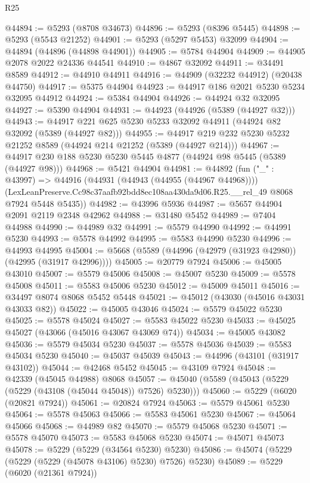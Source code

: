 \begin{lexlean}{R25}
\begin{coremodule}
@44894 := @5293 (@8708 @34673)
@44896 := @5293 (@8396 @5445)
@44898 := @5293 (@5543 @21252)
@44901 := @5293 (@5297 @5453) @32099
@44904 := @44894 (@44896 (@44898 @44901))
@44905 := @5784 @44904
@44909 := @44905 @2078 @2022 @24336 @44541
@44910 := @4867 @32092
@44911 := @34491 @8589
@44912 := @44910 @44911
@44916 := @44909 (@32232 @44912) (@20438 @44750)
@44917 := @5375 @44904
@44923 := @44917 @186 @2021 @5230 @5234 @32095 @44912
@44924 := @5384 @44904
@44926 := @44924 @32 @32095
@44927 := @5390 @44904
@44931 := @44923 (@44926 (@5389 (@44927 @32)))
@44943 := @44917 @221 @625 @5230 @5233 @32092 @44911 (@44924 @82 @32092 (@5389 (@44927 @82)))
@44955 := @44917 @219 @232 @5230 @5232 @21252 @8589 (@44924 @214 @21252 (@5389 (@44927 @214)))
@44967 := @44917 @230 @188 @5230 @5230 @5445 @4877 (@44924 @98 @5445 (@5389 (@44927 @98)))
@44968 := @5421 @44904
@44981 := @44892
    (fun ("_" : @43997) =>
    @44916
      (@44931 (@44943 (@44955 (@44967 @44968))))
      (LexLeanPreserve.Cc98c37aafb92bdd8ec108aa430da9d06.R25.__rel_49 @8068 @7924 @5448 @5435))
@44982 := @43996 @5936
@44987 := @5657 @44904 @2091 @2119 @2348 @42962
@44988 := @31480 @5452
@44989 := @7404 @44988
@44990 := @44989 @32
@44991 := @5579 @44990
@44992 := @44991 @5230
@44993 := @5578 @44992
@44995 := @5583 @44990 @5230
@44996 := @44993 @44995
@45004 := @5668 (@5589 (@44996 (@42979 (@31923 @42980)) (@42995 (@31917 @42996))))
@45005 := @20779 @7924
@45006 := @45005 @43010
@45007 := @5579 @45006
@45008 := @45007 @5230
@45009 := @5578 @45008
@45011 := @5583 @45006 @5230
@45012 := @45009 @45011
@45016 := @34497 @8074 @8068 @5452 @5448
@45021 := @45012 (@43030 (@45016 @43031 @43033 @82))
@45022 := @45005 @43046
@45024 := @5579 @45022 @5230
@45025 := @5578 @45024
@45027 := @5583 @45022 @5230
@45033 := @45025 @45027 (@43066 (@45016 @43067 @43069 @74))
@45034 := @45005 @43082
@45036 := @5579 @45034 @5230
@45037 := @5578 @45036
@45039 := @5583 @45034 @5230
@45040 := @45037 @45039
@45043 := @44996 (@43101 (@31917 @43102))
@45044 := @42468 @5452
@45045 := @43109 @7924
@45048 := @42339 (@45045 @44988) @8068
@45057 := @45040 (@5589 (@45043 (@5229 (@5229 (@43108 (@45044 @45048)) @7526) @5230)))
@45060 := @5229 (@6020 (@20821 @7924))
@45061 := @20824 @7924
@45063 := @5579 @45061 @5230
@45064 := @5578 @45063
@45066 := @5583 @45061 @5230
@45067 := @45064 @45066
@45068 := @44989 @82
@45070 := @5579 @45068 @5230
@45071 := @5578 @45070
@45073 := @5583 @45068 @5230
@45074 := @45071 @45073
@45078 := @5229 (@5229 (@34564 @5230) @5230)
@45086 := @45074 (@5229 (@5229 (@5229 (@45078 @43106) @5230) @7526) @5230)
@45089 := @5229 (@6020 (@21361 @7924))

\end{coremodule}
\end{lexlean}
